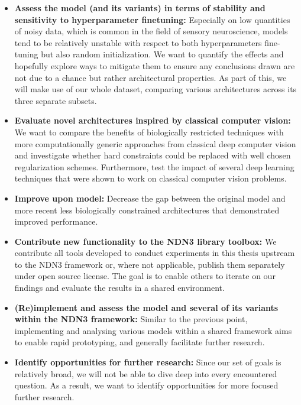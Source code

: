 \begin{itemize}
    \item \textbf{Assess the \citeauthor{antolik} model (and its variants) in terms of stability and sensitivity to hyperparameter finetuning:} Especially on low quantities of noisy data, which is common in the field of sensory neuroscience, models tend to be relatively unstable with respect to both hyperparameters fine-tuning but also random initialization. We want to quantify the effects and hopefully explore ways to mitigate them to ensure any conclusions drawn are not due to a chance but rather architectural properties. As part of this, we will make use of our whole dataset, comparing various architectures across its three separate subsets.
    \item \textbf{Evaluate novel architectures inspired by classical computer vision:} We want to compare the benefits of biologically restricted techniques with more computationally generic approaches from classical deep computer vision and investigate whether hard constraints could be replaced with well chosen regularization schemes. Furthermore, test the impact of several deep learning techniques that were shown to work on classical computer vision problems.
    \item \textbf{Improve upon \citeauthor{antolik} model:} Decrease the gap between the original model and more recent less biologically constrained architectures that demonstrated improved performance. 
    \item \textbf{Contribute new functionality to the NDN3 library toolbox:} We contribute all tools developed to conduct experiments in this thesis upstream to the NDN3 framework or, where not applicable, publish them separately under open source license. The goal is to enable others to iterate on our findings and evaluate the results in a shared environment.
    \item \textbf{(Re)implement and assess the \citeauthor{antolik} model and several of its variants within the NDN3 framework:} Similar to the previous point, implementing and analysing various models within a shared framework aims to enable rapid prototyping, and generally facilitate further research.
    \item \textbf{Identify opportunities for further research:} Since our set of goals is relatively broad, we will not be able to dive deep into every encountered question. As a result, we want to identify opportunities for more focused further research.
\end{itemize}

